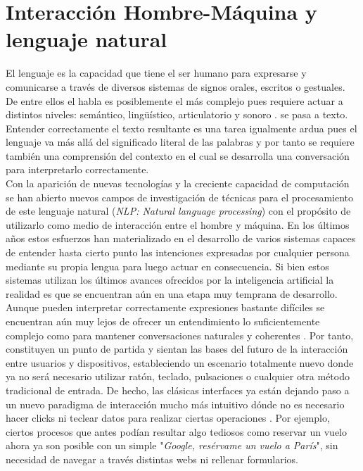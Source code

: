 \section{Interacción Hombre-Máquina y lenguaje natural}
El lenguaje es la capacidad que tiene el ser humano para expresarse y comunicarse a través de diversos sistemas de signos orales, escritos o gestuales. De entre ellos el habla es posiblemente el más complejo pues requiere actuar a distintos niveles: semántico, lingüístico, articulatorio y sonoro \cite{designTechniques}. se pasa a texto. Entender correctamente el texto resultante es una tarea igualmente ardua pues el lenguaje va más allá del significado literal de las palabras y por tanto se requiere también una comprensión del contexto en el cual se desarrolla una conversación para interpretarlo correctamente.\\

Con la aparición de nuevas tecnologías y la creciente capacidad de computación se han abierto nuevos campos de investigación de técnicas para el procesamiento de este lenguaje natural (\textit{NLP: Natural language processing}) con el propósito de utilizarlo como medio de interacción entre el hombre y máquina. En los últimos años estos esfuerzos han materializado en el desarrollo de varios sistemas capaces de entender hasta cierto punto las intenciones expresadas por cualquier persona mediante su propia lengua para luego actuar en consecuencia. Si bien estos sistemas utilizan los últimos avances ofrecidos por la inteligencia artificial la realidad es que se encuentran aún en una etapa muy temprana de desarrollo. Aunque pueden interpretar correctamente expresiones bastante difíciles se encuentran aún muy lejos de ofrecer un entendimiento lo suficientemente complejo como para mantener conversaciones naturales y coherentes \cite{designTechniques}. Por tanto, constituyen un punto de partida y sientan las bases del futuro de la interacción entre usuarios y dispositivos, estableciendo un escenario totalmente nuevo donde ya no será necesario utilizar ratón, teclado, pulsaciones o cualquier otra método tradicional de entrada. De hecho, las clásicas interfaces ya están dejando paso a un nuevo paradigma de interacción mucho más intuitivo dónde no es necesario hacer clicks ni teclear datos para realizar ciertas operaciones \cite{conversationSystems}. Por ejemplo, ciertos procesos que antes podían resultar algo tediosos como reservar un vuelo ahora ya son posible con un simple "\textit{Google, resérvame un vuelo a París}", sin necesidad de navegar a través distintas webs ni rellenar formularios.\\

